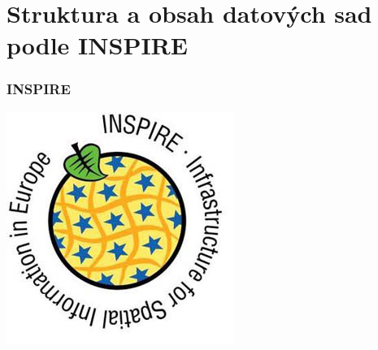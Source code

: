 \section{Struktura a obsah datových sad podle INSPIRE}

\begin{frame}
\frametitle{INSPIRE}
\begin{center}
\includegraphics[scale=0.45]{obrazky/inspire_logo.png}
\end{center}
\end{frame}


